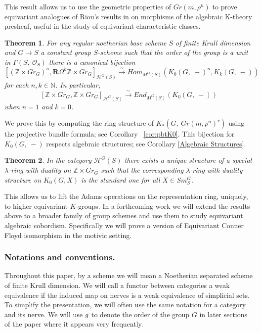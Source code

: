 \documentclass[11pt,twoside]{amsart}
\newtheorem{MainTheorem}{Theorem}[]
\theoremstyle{definition}
\theoremstyle{remark}
\numberwithin{equation}{section}
\newcommand{\mc}{\mathcal}
\newcommand{\ZZ}{\mathbb{Z}}
\newcommand{\iso}{\xrightarrow{\sim}}
\begin{document}
This result allows us to use the geometric properties of $Gr(m,\rho^n)$ to prove equivariant analogues of Riou's results in \cite{R10} on morphisms of the algebraic K-theory presheaf, useful in the study of equivariant characteristic classes.
\begin{MainTheorem}
For any regular noetherian base scheme $S$ of finite Krull dimension and $G\to S$ a constant group $S$-scheme such that the order of the group is a unit in $\Gamma(S,\ \mc{O}_S)$ there is a canonical bijection
\[ [(\ZZ\times Gr_G)^n,\mathbf{R}\Omega^k \ZZ\times Gr_G]_{\mc{H}^G(S)}\iso Hom_{M^G(S)}(K_0(G,\ -)^n,K_k(G,\ -))  \]
for each $n,k\in\mathbb{N}$. In particular,
\[ [\ZZ\times Gr_G,\ZZ\times Gr_G]_{\mc{H}^G(S)}\iso End_{M^G(S)}(K_0(G,\ -)) \]
when $n=1$ and $k=0$.
\end{MainTheorem}
We prove this by computing the ring structure of $K_*(G,\ Gr(m, \rho^n)^r)$ using the projective bundle formula; see Corollary ~\ref{cor:pbtK0}. This bijection for $K_0(G,\ -)$ respects algebraic structures; see Corollary \ref{Algebraic Structures}.
\begin{MainTheorem}
 In the category $\mc{H}^G(S)$ there exists a unique structure of a special $\lambda$-ring with duality on $\ZZ\times Gr_G$ such that the corresponding $\lambda$-ring with duality structure on $K_0(G,X)$ is the standard one for all $X\in Sm^G_S$.
\end{MainTheorem}
  This allows us to lift the Adams operations on the representation ring, uniquely, to higher equivariant $K$-groups. In a forthcoming work we will extend the results above to a broader family of group schemes and use them to study equivariant algebraic cobordism. Specifically we will prove a version of Equivariant Conner Floyd isomorphism \cite{O82} in the motivic setting. \\

\subsubsection*{Notations and conventions.} Throughout this paper, by a scheme we will mean a Noetherian separated scheme of finite Krull dimension. We will call a functor between categories a weak equivalence if the induced map on nerves is a weak equivalence of simplicial sets. To simplify the presentation, we will often use the same notation for a category and its nerve. We will use $\textsl{g}$ to denote the order of the group $G$ in later sections of the paper where it appears very frequently.
\end{document}
